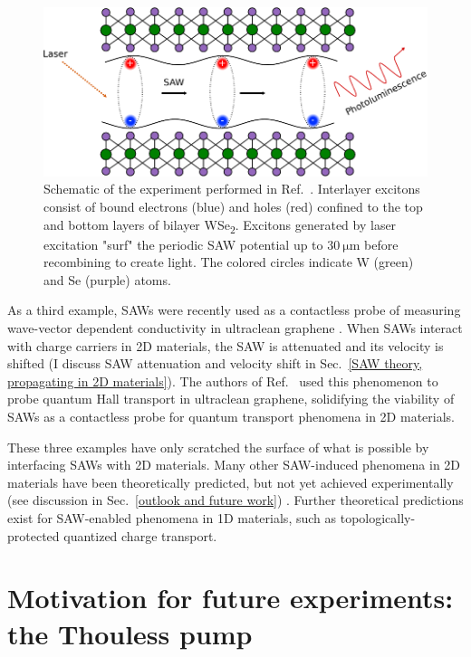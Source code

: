 \documentclass{beavtex_dub_edit}
\begin{document}
\begin{figure}
    \includegraphics[width = 1\textwidth]{IX transport fig.pdf}
    \caption[Schematic of the experiment performed in Ref.\ \cite{peng_long-range_2022}.]{Schematic of the experiment performed in Ref.\ \cite{peng_long-range_2022}. Interlayer excitons consist of bound electrons (blue) and holes (red) confined to the top and bottom layers of bilayer WSe\textsubscript{2}. Excitons generated by laser excitation "surf" the periodic SAW potential up to $\SI{30}{\micro\meter}$ before recombining to create light. The colored circles indicate W (green) and Se (purple) atoms.}
    \label{IX transport fig}
\end{figure}

As a third example, SAWs were recently used as a contactless probe of measuring wave-vector dependent conductivity in ultraclean graphene \cite{fang_quantum_2023}. When SAWs interact with charge carriers in 2D materials, the SAW is attenuated and its velocity is shifted (I discuss SAW attenuation and velocity shift in Sec.\ \ref{SAW theory, propagating in 2D materials}). The authors of Ref.\ \cite{fang_quantum_2023} used this phenomenon to probe quantum Hall transport in ultraclean graphene, solidifying the viability of SAWs as a contactless probe for quantum transport phenomena in 2D materials. 

These three examples have only scratched the surface of what is possible by interfacing SAWs with 2D materials. Many other SAW-induced phenomena in 2D materials have been theoretically predicted, but not yet achieved experimentally (see discussion in Sec.\ \ref{outlook and future work}) \cite{nie_surface_2023}. Further theoretical predictions exist for SAW-enabled phenomena in 1D materials, such as topologically-protected quantized charge transport.

\section{Motivation for future experiments: the Thouless pump} \label{Thouless pump intro chapter}
\end{document}
